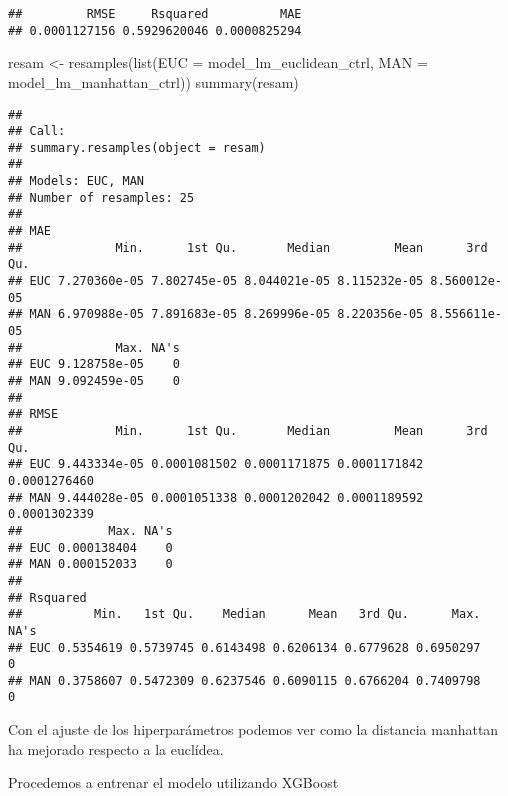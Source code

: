 \documentclass[
]{article}
\newenvironment{Shaded}{\begin{snugshade}}{\end{snugshade}}
\newcommand{\AttributeTok}[1]{\textcolor[rgb]{0.77,0.63,0.00}{#1}}
\newcommand{\FunctionTok}[1]{\textcolor[rgb]{0.00,0.00,0.00}{#1}}
\newcommand{\NormalTok}[1]{#1}
\newcommand{\OtherTok}[1]{\textcolor[rgb]{0.56,0.35,0.01}{#1}}
\begin{document}
\begin{verbatim}
##         RMSE     Rsquared          MAE 
## 0.0001127156 0.5929620046 0.0000825294
\end{verbatim}

\begin{Shaded}
\begin{Highlighting}[]
\NormalTok{resam }\OtherTok{\textless{}{-}} \FunctionTok{resamples}\NormalTok{(}\FunctionTok{list}\NormalTok{(}\AttributeTok{EUC =}\NormalTok{ model\_lm\_euclidean\_ctrl,}
                        \AttributeTok{MAN =}\NormalTok{ model\_lm\_manhattan\_ctrl))}
\FunctionTok{summary}\NormalTok{(resam)}
\end{Highlighting}
\end{Shaded}

\begin{verbatim}
## 
## Call:
## summary.resamples(object = resam)
## 
## Models: EUC, MAN 
## Number of resamples: 25 
## 
## MAE 
##             Min.      1st Qu.       Median         Mean      3rd Qu.
## EUC 7.270360e-05 7.802745e-05 8.044021e-05 8.115232e-05 8.560012e-05
## MAN 6.970988e-05 7.891683e-05 8.269996e-05 8.220356e-05 8.556611e-05
##             Max. NA's
## EUC 9.128758e-05    0
## MAN 9.092459e-05    0
## 
## RMSE 
##             Min.      1st Qu.       Median         Mean      3rd Qu.
## EUC 9.443334e-05 0.0001081502 0.0001171875 0.0001171842 0.0001276460
## MAN 9.444028e-05 0.0001051338 0.0001202042 0.0001189592 0.0001302339
##            Max. NA's
## EUC 0.000138404    0
## MAN 0.000152033    0
## 
## Rsquared 
##          Min.   1st Qu.    Median      Mean   3rd Qu.      Max. NA's
## EUC 0.5354619 0.5739745 0.6143498 0.6206134 0.6779628 0.6950297    0
## MAN 0.3758607 0.5472309 0.6237546 0.6090115 0.6766204 0.7409798    0
\end{verbatim}

Con el ajuste de los hiperparámetros podemos ver como la distancia
manhattan ha mejorado respecto a la euclídea.

Procedemos a entrenar el modelo utilizando XGBoost
\end{document}

